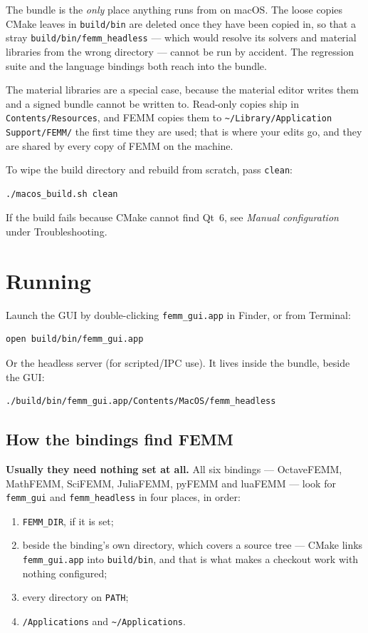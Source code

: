 \documentclass[11pt]{article}
\begin{document}
The bundle is the \emph{only} place anything runs from on macOS.  The
loose copies CMake leaves in \texttt{build/bin} are deleted once they
have been copied in, so that a stray \texttt{build/bin/femm\_headless}
--- which would resolve its solvers and material libraries from the
wrong directory --- cannot be run by accident.  The regression suite and
the language bindings both reach into the bundle.

The material libraries are a special case, because the material editor
writes them and a signed bundle cannot be written to.  Read-only copies
ship in \texttt{Contents/Resources}, and FEMM copies them to
\texttt{\textasciitilde/Library/Application Support/FEMM/} the first time
they are used; that is where your edits go, and they are shared by every
copy of FEMM on the machine.

To wipe the build directory and rebuild from scratch, pass
\texttt{clean}:
\begin{lstlisting}
./macos_build.sh clean
\end{lstlisting}

If the build fails because CMake cannot find Qt~6, see
\textit{Manual configuration} under Troubleshooting.

\section{Running}

Launch the GUI by double-clicking \texttt{femm\_gui.app} in Finder, or
from Terminal:
\begin{lstlisting}
open build/bin/femm_gui.app
\end{lstlisting}

Or the headless server (for scripted/IPC use).  It lives inside the
bundle, beside the GUI:
\begin{lstlisting}
./build/bin/femm_gui.app/Contents/MacOS/femm_headless
\end{lstlisting}

\subsection{How the bindings find FEMM}

\textbf{Usually they need nothing set at all.}  All six bindings ---
OctaveFEMM, MathFEMM, SciFEMM, JuliaFEMM, pyFEMM and luaFEMM --- look for
\texttt{femm\_gui} and \texttt{femm\_headless} in four places, in order:

\begin{enumerate}
\item \texttt{FEMM\_DIR}, if it is set;
\item beside the binding's own directory, which covers a source tree ---
      CMake links \texttt{femm\_gui.app} into \texttt{build/bin}, and that
      is what makes a checkout work with nothing configured;
\item every directory on \texttt{PATH};
\item \texttt{/Applications} and
      \texttt{\textasciitilde/Applications}.
\end{enumerate}
\end{document}
